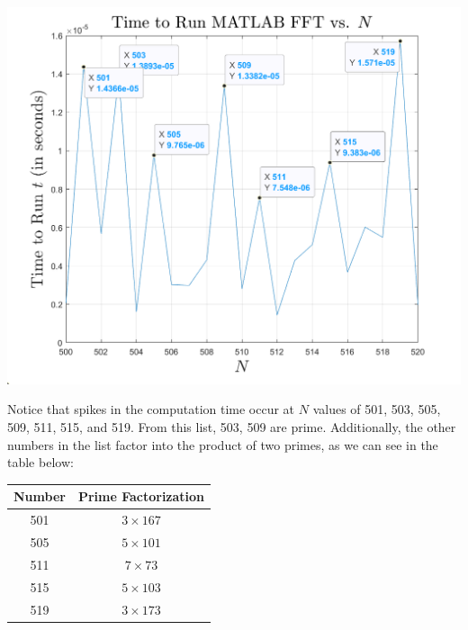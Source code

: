 \documentclass{article}
\begin{document}
\begin{center}
    \includegraphics[scale = 0.45]{Images/timetoRunFFT.png}
\end{center}
Notice that spikes in the computation time occur at $N$ values of 501, 503, 505, 509, 511, 515, and 519. From this list, 503, 509 are prime. Additionally, the other numbers in the list factor into the product of two primes, as we can see in the table below:
\newline
\begin{center}
    \begin{tabular}{c|c}
        Number & Prime Factorization \\
        \hline
        501 & $3\times 167$ \\
        505 & $5 \times 101$ \\
        511 & $7\times 73$ \\
        515 & $5\times 103$ \\
        519 & $3\times 173$ \\
    \end{tabular}
\end{center}
\end{document}
